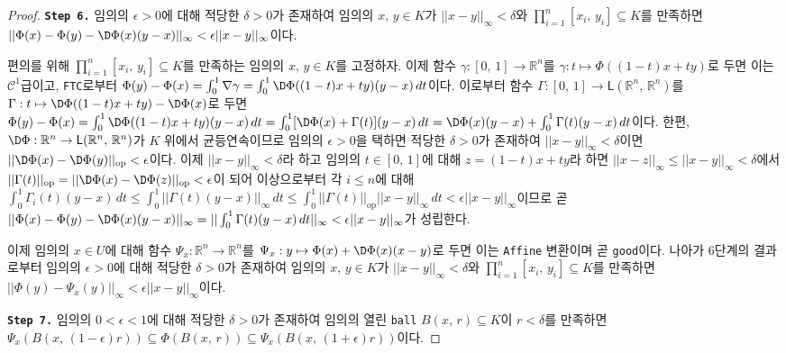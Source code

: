 \begin{proof}
    \noindent\texttt{\textbf{Step 6.}} 임의의 $\epsilon>0$에 대해 적당한 $\delta>0$가 존재하여 임의의 $x,\,y\in K$가 $||x-y||_\infty<\delta$와 $\prod_{i=1}^n[x_i,\,y_i]\subseteq K$를 만족하면 $||\Phi(x)-\Phi(y)-\D\Phi(x)(y-x)||_\infty<\epsilon||x-y||_\infty$이다.

    편의를 위해 $\prod_{i=1}^n[x_i,\,y_i]\subseteq K$를 만족하는 임의의 $x,\,y\in K$를 고정하자. 이제 함수 $\gamma:[0,\,1]\to\mathbb{R}^n$를 $\gamma:t\mapsto\Phi((1-t)x+ty)$로 두면 이는 $\mathcal{C}^1$급이고, \texttt{FTC}로부터 $\Phi(y)-\Phi(x)=\int_0^1\nabla\gamma=\int_0^1\D\Phi((1-t)x+ty)(y-x)\,dt$이다. 이로부터 함수 $\Gamma:[0,\,1]\to\mathsf{L}(\mathbb{R}^n,\,\mathbb{R}^n)$를 $\Gamma:t\mapsto\D\Phi((1-t)x+ty)-\D\Phi(x)$로 두면 $\Phi(y)-\Phi(x)=\int_0^1\D\Phi((1-t)x+ty)(y-x)\,dt=\int_0^1[\D\Phi(x)+\Gamma(t)](y-x)\,dt=\D\Phi(x)(y-x)+\int_0^1\Gamma(t)(y-x)\,dt$이다. 한편, $\D\Phi:\mathbb{R}^n\to\mathsf{L}(\mathbb{R}^n,\,\mathbb{R}^n)$가 $K$ 위에서 균등연속이므로 임의의 $\epsilon>0$을 택하면 적당한 $\delta>0$가 존재하여 $||x-y||_\infty<\delta$이면 $||\D\Phi(x)-\D\Phi(y)||_\mathrm{op}<\epsilon$이다. 이제 $||x-y||_\infty<\delta$라 하고 임의의 $t\in[0,\,1]$에 대해 $z=(1-t)x+ty$라 하면 $||x-z||_\infty\leq||x-y||_\infty<\delta$에서 $||\Gamma(t)||_\mathrm{op}=||\D\Phi(x)-\D\Phi(z)||_\mathrm{op}<\epsilon$이 되어 이상으로부터 각 $i\leq n$에 대해 $\int_0^1\Gamma_i(t)(y-x)\,dt\leq\int_0^1||\Gamma(t)(y-x)||_\infty\,dt\leq\int_0^1||\Gamma(t)||_\mathrm{op}||x-y||_\infty\,dt<\epsilon||x-y||_\infty$이므로 곧 $||\Phi(x)-\Phi(y)-\D\Phi(x)(y-x)||_\infty=||\int_0^1\Gamma(t)(y-x)\,dt||_\infty<\epsilon||x-y||_\infty$가 성립한다.

    이제 임의의 $x\in U$에 대해 함수 $\Psi_x:\mathbb{R}^n\to\mathbb{R}^n$를 $\Psi_x:y\mapsto\Phi(x)+\D\Phi(x)(x-y)$로 두면 이는 \texttt{Affine} 변환이며 곧 \texttt{good}이다. 나아가 6단계의 결과로부터 임의의 $\epsilon>0$에 대해 적당한 $\delta>0$가 존재하여 임의의 $x,\,y\in K$가 $||x-y||_\infty<\delta$와 $\prod_{i=1}^n[x_i,\,y_i]\subseteq K$를 만족하면 $||\Phi(y)-\Psi_{x}(y)||_\infty<\epsilon||x-y||_\infty$이다.

    \noindent\texttt{\textbf{Step 7.}} 임의의 $0<\epsilon<1$에 대해 적당한 $\delta>0$가 존재하여 임의의 열린 \texttt{ball} $B(x,\,r)\subseteq K$이 $r<\delta$를 만족하면 $\Psi_x(B(x,\,(1-\epsilon)r))\subseteq\Phi(B(x,\,r))\subseteq\Psi_x(B(x,\,(1+\epsilon)r))$이다.


\end{proof}
